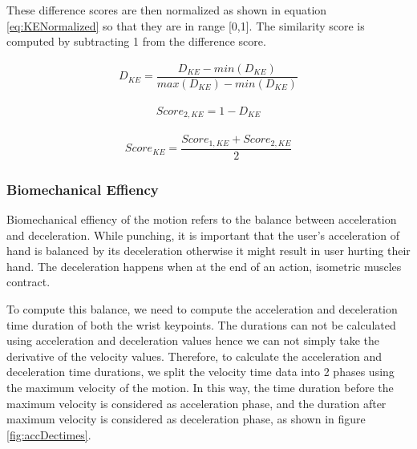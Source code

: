 
These difference scores are then normalized as shown in equation \ref{eq:KENormalized} so that they are in range [0,1]. The similarity score is computed by subtracting 1 from the difference score. 

\begin{align}
  D_{KE} = \dfrac{D_{KE} - min(D_{KE})}{max(D_{KE})-min(D_{KE})}
  \label{eq:KENormalized}
\end{align}

\begin{align}
  Score_{2,KE} = 1- D_{KE}
\end{align}

\begin{align}
  Score_{KE} = \dfrac{Score_{1,KE}+Score_{2,KE}}{2}
  \label{eq:overallKEScore}
\end{align}

\subsubsection{Biomechanical Effiency}
Biomechanical effiency of the motion refers to the balance between acceleration and deceleration. While punching, it is important that the user's acceleration of hand is balanced by its deceleration otherwise it might result in user hurting their hand. The deceleration happens when at the end of an action, isometric muscles contract. 

To compute this balance, we need to compute the acceleration and deceleration time duration of both the wrist keypoints. The durations can not be calculated using acceleration and deceleration values hence we can not simply take the derivative of the velocity values. Therefore, to calculate the acceleration and deceleration time durations, we split the velocity time data into 2 phases using the maximum velocity of the motion. In this way, the time duration before the maximum velocity is considered as acceleration phase, and the duration after maximum velocity is considered as deceleration phase, as shown in figure \ref{fig:accDectimes}.

